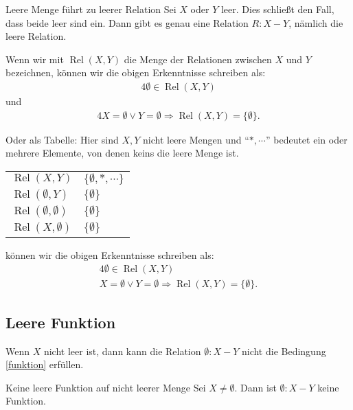 \documentclass[a4paper]{amsart}
\theoremstyle{definition}
\begin{document}
\begin{Satz}{Leere Menge führt zu leerer Relation}
   Sei $X$ oder $Y$ leer. Dies schließt den Fall, dass beide leer sind ein. Dann gibt es genau eine Relation $R \colon X - Y$, nämlich die leere Relation.
\end{Satz}

Wenn wir mit $\operatorname{Rel}(X,Y)$ die Menge der Relationen zwischen $X$ und $Y$ bezeichnen, 
können wir die obigen Erkenntnisse schreiben als:
\begin{alignat}{4}
   \boxed{\emptyset \in \operatorname{Rel}(X,Y)}
\end{alignat}
und
\begin{alignat}{4}
   X = \emptyset \lor Y = \emptyset \Rightarrow \operatorname{Rel}(X,Y) = \{ \emptyset \}.
\end{alignat}

Oder als Tabelle: Hier sind $X, Y$ nicht leere Mengen und "`$*, \cdots$"' bedeutet ein oder mehrere Elemente, von denen keins die leere Menge ist.

\begin{tabular}{|l|l|}
   \hline
   $\operatorname{Rel}(X,Y)$ & $\{ \emptyset, *, \cdots \}$\\
   $\operatorname{Rel}(\emptyset,Y)$ & $\{\emptyset\}$\\
   $\operatorname{Rel}(\emptyset,\emptyset)$ & $\{\emptyset\}$\\
   $\operatorname{Rel}(X,\emptyset)$ & $\{\emptyset\}$\\
   \hline
\end{tabular}

können wir die obigen Erkenntnisse schreiben als:
\begin{alignat*}{4}
   \emptyset \in \operatorname{Rel}(X,Y)\\
   X = \emptyset \lor Y = \emptyset \Rightarrow \operatorname{Rel}(X,Y) = \{ \emptyset \}.
\end{alignat*}

\subsection*{Leere Funktion}
Wenn $X$ nicht leer ist, dann kann die Relation $\emptyset \colon X - Y$ nicht die Bedingung \eqref{funktion} erfüllen.
\begin{Satz}{Keine leere Funktion auf nicht leerer Menge}
   Sei $X \ne \emptyset$. Dann ist $\emptyset \colon X - Y$ keine Funktion.
\end{Satz}
\end{document}
